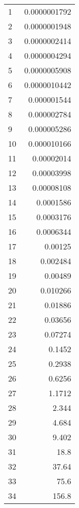 \begin{center}
    \begin{supertabular}{ l | *{1}{d{10}}}
1 & 0.0000001792 \\
2 & 0.0000001948 \\
3 & 0.0000002414 \\
4 & 0.0000004294 \\
5 & 0.0000005908 \\
6 & 0.0000010442 \\
7 & 0.000001544 \\
8 & 0.000002784 \\
9 & 0.000005286 \\
10 & 0.000010166 \\
11 & 0.00002014 \\
12 & 0.00003998 \\
13 & 0.00008108 \\
14 & 0.0001586 \\
15 & 0.0003176 \\
16 & 0.0006344 \\
17 & 0.00125 \\
18 & 0.002484 \\
19 & 0.00489 \\
20 & 0.010266 \\
21 & 0.01886 \\
22 & 0.03656 \\
23 & 0.07274 \\
24 & 0.1452 \\
25 & 0.2938 \\
26 & 0.6256 \\
27 & 1.1712 \\
28 & 2.344 \\
29 & 4.684 \\
30 & 9.402 \\
31 & 18.8 \\
32 & 37.64 \\
33 & 75.6 \\
34 & 156.8 \\

    \end{supertabular}
    \end{center}
